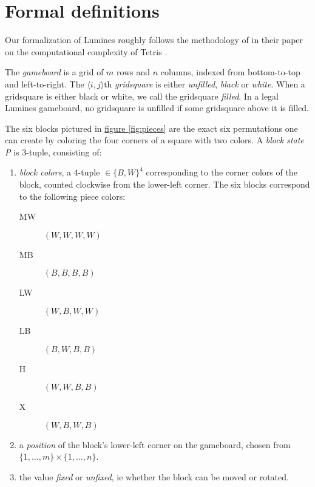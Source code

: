 \section{Formal definitions}
Our formalization of Lumines roughly follows the methodology of \citeauthor{tetris} in their paper on the computational complexity of Tetris \cite{tetris}.

\begin{description}[style=unboxed, leftmargin=0cm,labelsep=1em]
    \item[The gameboard] The \emph{gameboard} is a grid of $m$ rows and $n$ columns, indexed from bottom-to-top and left-to-right. The $\langle i,j \rangle$th \emph{gridsquare} is either \emph{unfilled}, \emph{black} or \emph{white}. When a gridsquare is either black or white, we call the gridsquare \emph{filled}. In a legal Lumines gameboard, no gridsquare is unfilled if some gridsquare above it is filled.

    \item[Game pieces] The six blocks pictured in \hyperref[fig:pieces]{figure \ref*{fig:pieces}} are the exact six permutations one can create by coloring the four corners of a square with two colors. A \emph{block state P} is 3-tuple, consisting of: 
    \begin{enumerate}
        \item \emph{block colors}, a 4-tuple $\in \{B,W\}^4$ corresponding to the corner colors of the block, counted clockwise from the lower-left corner. The six blocks correspond to the following piece colors:

        \begin{description}
            \item[MW] $(W,W,W,W)$
            \item[MB] $(B,B,B,B)$
            \item[LW] $(W,B,W,W)$
            \item[LB] $(B,W,B,B)$
            \item[H] $(W,W,B,B)$
            \item[X] $(W,B,W,B)$
        \end{description}

        \item a \emph{position} of the block's lower-left corner on the gameboard, chosen from $\{1, \ldots, m\} \times \{1, \ldots, n\}$.
        \item the value \emph{fixed} or \emph{unfixed}, ie whether the block can be moved or rotated.
    \end{enumerate}


\end{description}
